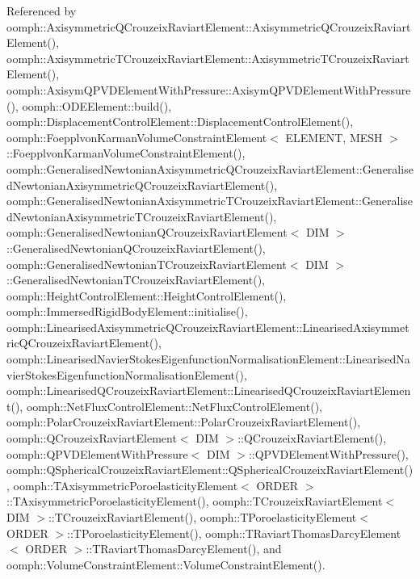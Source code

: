 Referenced by oomph\+::\+Axisymmetric\+Q\+Crouzeix\+Raviart\+Element\+::\+Axisymmetric\+Q\+Crouzeix\+Raviart\+Element(), oomph\+::\+Axisymmetric\+T\+Crouzeix\+Raviart\+Element\+::\+Axisymmetric\+T\+Crouzeix\+Raviart\+Element(), oomph\+::\+Axisym\+Q\+P\+V\+D\+Element\+With\+Pressure\+::\+Axisym\+Q\+P\+V\+D\+Element\+With\+Pressure(), oomph\+::\+O\+D\+E\+Element\+::build(), oomph\+::\+Displacement\+Control\+Element\+::\+Displacement\+Control\+Element(), oomph\+::\+Foepplvon\+Karman\+Volume\+Constraint\+Element$<$ E\+L\+E\+M\+E\+N\+T, M\+E\+S\+H $>$\+::\+Foepplvon\+Karman\+Volume\+Constraint\+Element(), oomph\+::\+Generalised\+Newtonian\+Axisymmetric\+Q\+Crouzeix\+Raviart\+Element\+::\+Generalised\+Newtonian\+Axisymmetric\+Q\+Crouzeix\+Raviart\+Element(), oomph\+::\+Generalised\+Newtonian\+Axisymmetric\+T\+Crouzeix\+Raviart\+Element\+::\+Generalised\+Newtonian\+Axisymmetric\+T\+Crouzeix\+Raviart\+Element(), oomph\+::\+Generalised\+Newtonian\+Q\+Crouzeix\+Raviart\+Element$<$ D\+I\+M $>$\+::\+Generalised\+Newtonian\+Q\+Crouzeix\+Raviart\+Element(), oomph\+::\+Generalised\+Newtonian\+T\+Crouzeix\+Raviart\+Element$<$ D\+I\+M $>$\+::\+Generalised\+Newtonian\+T\+Crouzeix\+Raviart\+Element(), oomph\+::\+Height\+Control\+Element\+::\+Height\+Control\+Element(), oomph\+::\+Immersed\+Rigid\+Body\+Element\+::initialise(), oomph\+::\+Linearised\+Axisymmetric\+Q\+Crouzeix\+Raviart\+Element\+::\+Linearised\+Axisymmetric\+Q\+Crouzeix\+Raviart\+Element(), oomph\+::\+Linearised\+Navier\+Stokes\+Eigenfunction\+Normalisation\+Element\+::\+Linearised\+Navier\+Stokes\+Eigenfunction\+Normalisation\+Element(), oomph\+::\+Linearised\+Q\+Crouzeix\+Raviart\+Element\+::\+Linearised\+Q\+Crouzeix\+Raviart\+Element(), oomph\+::\+Net\+Flux\+Control\+Element\+::\+Net\+Flux\+Control\+Element(), oomph\+::\+Polar\+Crouzeix\+Raviart\+Element\+::\+Polar\+Crouzeix\+Raviart\+Element(), oomph\+::\+Q\+Crouzeix\+Raviart\+Element$<$ D\+I\+M $>$\+::\+Q\+Crouzeix\+Raviart\+Element(), oomph\+::\+Q\+P\+V\+D\+Element\+With\+Pressure$<$ D\+I\+M $>$\+::\+Q\+P\+V\+D\+Element\+With\+Pressure(), oomph\+::\+Q\+Spherical\+Crouzeix\+Raviart\+Element\+::\+Q\+Spherical\+Crouzeix\+Raviart\+Element(), oomph\+::\+T\+Axisymmetric\+Poroelasticity\+Element$<$ O\+R\+D\+E\+R $>$\+::\+T\+Axisymmetric\+Poroelasticity\+Element(), oomph\+::\+T\+Crouzeix\+Raviart\+Element$<$ D\+I\+M $>$\+::\+T\+Crouzeix\+Raviart\+Element(), oomph\+::\+T\+Poroelasticity\+Element$<$ O\+R\+D\+E\+R $>$\+::\+T\+Poroelasticity\+Element(), oomph\+::\+T\+Raviart\+Thomas\+Darcy\+Element$<$ O\+R\+D\+E\+R $>$\+::\+T\+Raviart\+Thomas\+Darcy\+Element(), and oomph\+::\+Volume\+Constraint\+Element\+::\+Volume\+Constraint\+Element().

